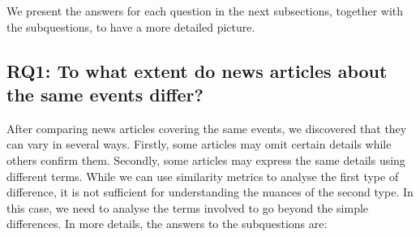 We present the answers for each question in the next subsections, together with the subquestions, to have a more detailed picture.


\subsection*{RQ1: To what extent do news articles about the same events differ?}

After comparing news articles covering the same events, we discovered that they can vary in several ways. Firstly, some articles may omit certain details while others confirm them. Secondly, some articles may express the same details using different terms. While we can use similarity metrics to analyse the first type of difference, it is not sufficient for understanding the nuances of the second type. In this case, we need to analyse the terms involved to go beyond the simple differences.
In more details, the answers to the subquestions are:

